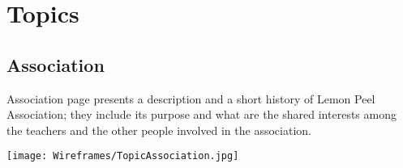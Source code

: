 \documentclass[../../DD.tex]{subfiles}
\begin{document}
\section{Topics \label{sect:2.1}}
	\subsection{Association}
		Association page presents a description and a short history of Lemon Peel Association; they include its purpose and what are the shared interests among the teachers and the other people involved in the association.

		\texttt{[image: Wireframes/TopicAssociation.jpg]}
\end{document}
